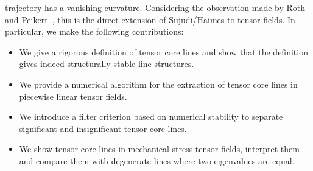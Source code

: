 trajectory has a vanishing curvature.
%
Considering the observation made by Roth and Peikert~\cite{Roth1998}, this is
the direct extension of Sujudi/Haimes to tensor fields.
%
In particular, we make the following contributions:
%
\begin{itemize}
    \item  We give a rigorous definition of tensor core lines and show that the
    definition gives indeed structurally stable line structures.
    \item We provide a numerical algorithm for the extraction of tensor core
    lines in piecewise linear tensor fields.
    \item We introduce a filter criterion based on numerical stability to
    separate significant and insignificant tensor core lines.
    \item We show tensor core lines in mechanical stress tensor fields,
    interpret them and compare them with degenerate lines where two eigenvalues
    are equal.
\end{itemize}
%
%

%
